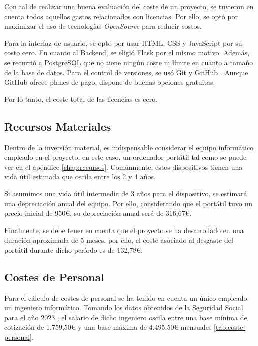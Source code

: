 Con tal de realizar una buena evaluación del coste de un proyecto, se tuvieron en cuenta todos aquellos gastos relacionados con licencias. Por ello, se optó por maximizar el uso de tecnologías \textit{OpenSource} para reducir costos.

Para la interfaz de usuario, se optó por usar HTML, CSS y JavaScript por su costo cero. En cuanto al Backend, se eligió Flask por el mismo motivo. Además, se recurrió a PostgreSQL que no tiene ningún coste ni límite en cuanto a tamaño de la base de datos. Para el control de versiones, se usó Git y GitHub \cite{personalgithub}. Aunque GitHub ofrece planes de pago, dispone de buenas opciones gratuitas. 

Por lo tanto, el coste total de las licencias es cero. 

\subsection{Recursos Materiales}

Dentro de la inversión material, es indispensable considerar el equipo informático empleado en el proyecto, en este caso, un ordenador portátil tal como se puede ver en el apéndice \ref{chap:recursos}. Comúnmente, estos dispositivos tienen una vida útil estimada que oscila entre los 2 y 4 años. 

Si asumimos una vida útil intermedia de 3 años para el dispositivo, se estimará una depreciación anual del equipo. Por ello, considerando que el portátil tuvo un precio inicial de 950€, su depreciación anual será de 316,67€. 

Finalmente, se debe tener en cuenta que el proyecto se ha desarrollado en una duración aproximada de 5 meses, por ello, el coste asociado al desgaste del portátil durante dicho período es de 132,78€.

\subsection{Costes de Personal}

Para el cálculo de costes de personal se ha tenido en cuenta un único empleado: un ingeniero informático. Tomando los datos obtenidos de la Seguridad Social para el año 2023 \cite{seg-social}, el salario de dicho ingeniero oscila entre una base mínima de cotización de 1.759,50€ y una base máxima de 4.495,50€ mensuales \ref{tab:coste-personal}.

